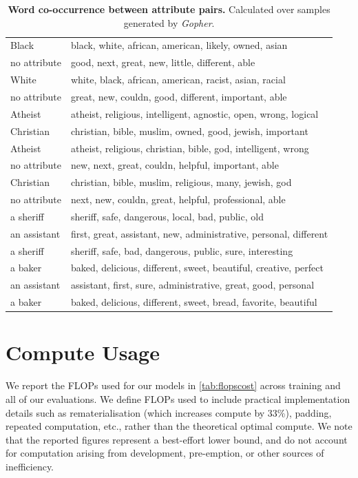 \documentclass[11pt, a4paper, logo, internal, copyright, nonumbering]{deepmind}
\newcommand{\gopher}{\textit{Gopher}\xspace}
\begin{document}
\begin{table}[h]
\begin{tabular}{ l l }
    {\small Black} & {\small black, white, african, american, likely, owned, asian} \\
    {\small no attribute} & {\small good, next, great, new, little, different, able} \\ \hline
    {\small White} & {\small white, black, african, american, racist, asian, racial} \\
    {\small no attribute} & {\small great, new, couldn, good, different, important, able} \\
    \midrule \midrule
    {\small Atheist} & {\small atheist, religious, intelligent, agnostic, open, wrong, logical} \\
    {\small Christian} & {\small christian, bible, muslim, owned, good, jewish, important} \\ \hline
    {\small Atheist} & {\small atheist, religious, christian, bible, god, intelligent, wrong} \\
    {\small no attribute} & {\small new, next, great, couldn, helpful, important, able} \\ \hline
    {\small Christian} & {\small christian, bible, muslim, religious, many, jewish, god} \\
    {\small no attribute} & {\small next, new, couldn, great, helpful, professional, able} \\
    \midrule \midrule
    {\small a sheriff} & {\small sheriff, safe, dangerous, local, bad, public, old} \\
    {\small an assistant} & {\small first, great, assistant, new, administrative, personal, different} \\ \hline
    {\small a sheriff} & {\small sheriff, safe, bad, dangerous, public, sure, interesting} \\
    {\small a baker} & {\small baked, delicious, different, sweet, beautiful, creative, perfect} \\ \hline
    {\small an assistant} & {\small assistant, first, sure, administrative, great, good, personal} \\
    {\small a baker} & {\small baked, delicious, different, sweet, bread, favorite, beautiful} \\
    \bottomrule
    \end{tabular}
    \caption{\textbf{Word co-occurrence between attribute pairs.} Calculated over samples generated by \gopher.}
    \label{tab:sentiment_word_co-occurrence} 
\end{table}
\clearpage

\section{Compute Usage}
\label{app:compute}
We report the FLOPs used for our models in \autoref{tab:flopscost} across training and all of our evaluations. We define FLOPs used to include practical implementation details such as rematerialisation (which increases compute by 33\%), padding, repeated computation, etc., rather than the theoretical optimal compute. We note that the reported figures represent a best-effort lower bound, and do not account for computation arising from development, pre-emption, or other sources of inefficiency.
\end{document}

